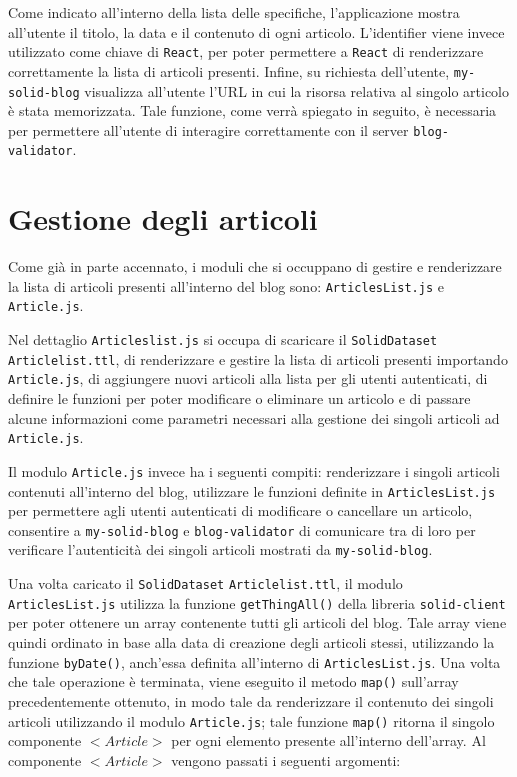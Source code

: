 \medskip

Come indicato all'interno della lista delle specifiche, l'applicazione mostra all'utente il titolo, la data e il contenuto di ogni articolo. L'identifier viene invece utilizzato come chiave di {\tt React}, per poter permettere a {\tt React} di renderizzare correttamente la lista di articoli presenti. Infine, su richiesta dell'utente, {\tt my-solid-blog} visualizza all'utente l'URL in cui la risorsa relativa al singolo articolo è stata memorizzata. Tale funzione, come verrà spiegato in seguito, è necessaria per permettere all'utente di interagire correttamente con il server {\tt blog-validator}.
\bigskip

\section{Gestione degli articoli}

\medskip

Come già in parte accennato, i moduli che si occuppano di gestire e renderizzare la lista di articoli presenti all'interno del blog sono: {\tt ArticlesList.js} e {\tt Article.js}.

\bigskip

Nel dettaglio {\tt Articleslist.js} si occupa di scaricare il {\tt SolidDataset}\\{\tt Articlelist.ttl}, di renderizzare e gestire la lista di articoli presenti importando {\tt Article.js}, di aggiungere nuovi articoli alla lista per gli utenti autenticati, di definire le funzioni per poter modificare o eliminare un articolo e di passare alcune informazioni come parametri necessari alla gestione dei singoli articoli ad {\tt Article.js}.

\bigskip

Il modulo {\tt Article.js} invece ha i seguenti compiti: renderizzare i singoli articoli contenuti all'interno del blog, utilizzare le funzioni definite in {\tt ArticlesList.js} per permettere agli utenti autenticati di modificare o cancellare un articolo, consentire a {\tt my-solid-blog} e {\tt blog-validator} di comunicare tra di loro per verificare l'autenticità dei singoli articoli mostrati da {\tt my-solid-blog}.

\bigskip

Una volta caricato il {\tt SolidDataset} {\tt Articlelist.ttl}, il modulo {\tt ArticlesList.js} utilizza la funzione {\tt getThingAll()} della libreria {\tt solid-client} per poter ottenere un array contenente tutti gli articoli del blog. Tale array viene quindi ordinato in base alla data di creazione degli articoli stessi, utilizzando la funzione {\tt byDate()}, anch'essa definita all'interno di {\tt ArticlesList.js}. Una volta che tale operazione è terminata, viene eseguito il metodo {\tt map()} sull'array precedentemente ottenuto, in modo tale da renderizzare il contenuto dei singoli articoli utilizzando il modulo {\tt Article.js}; tale funzione {\tt map()} ritorna il singolo componente $<Article>$ per ogni elemento presente all'interno dell'array. Al componente $<Article>$ vengono passati i seguenti argomenti:

